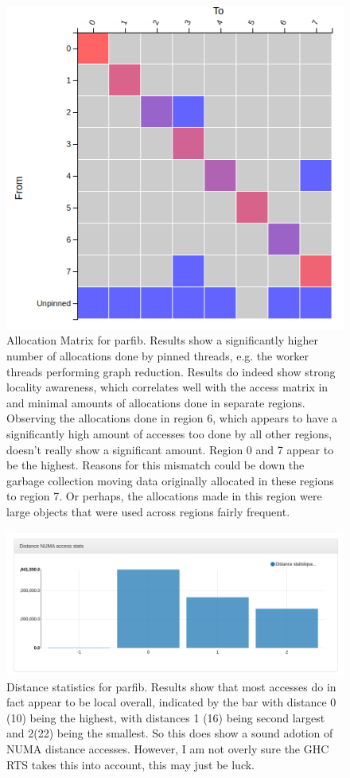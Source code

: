 \documentclass[a4paper,11pt]{article}
\begin{document}
\begin{figure}[!htb]
    \centering
    \includegraphics[width=0.5\linewidth]{TechMemo/results/parfib/parfib_alloc.png}
    \caption{Allocation Matrix for parfib. Results show a significantly higher number of allocations done by pinned threads, e.g. the worker threads performing graph reduction. Results do indeed show strong locality awareness, which correlates well with the access matrix in  and minimal amounts of allocations done in separate regions. Observing the allocations done in region 6, which appears to have a significantly high amount of accesses too done by all other regions, doesn't really show a significant amount. Region 0 and 7 appear to be the highest. Reasons for this mismatch could be down the garbage collection moving data originally allocated in these regions to region 7. Or perhaps, the allocations made in this region were large objects that were used across regions fairly frequent.}
    \label{fig:parfib_alloc_matrix}
\end{figure}

\begin{figure}[!htb]
    \centering
    \includegraphics[width=\linewidth]{TechMemo/results/parfib/parfib_distance.png}
    \caption{Distance statistics for parfib. Results show that most accesses do in fact appear to be local overall, indicated by the bar with distance 0 (10) being the highest, with distances 1 (16) being second largest and 2(22) being the smallest. So this does show a sound adotion of NUMA distance accesses. However, I am not overly sure the GHC RTS takes this into account, this may just be luck. }
    \label{fig:parfib_distance}
\end{figure}
\end{document}
